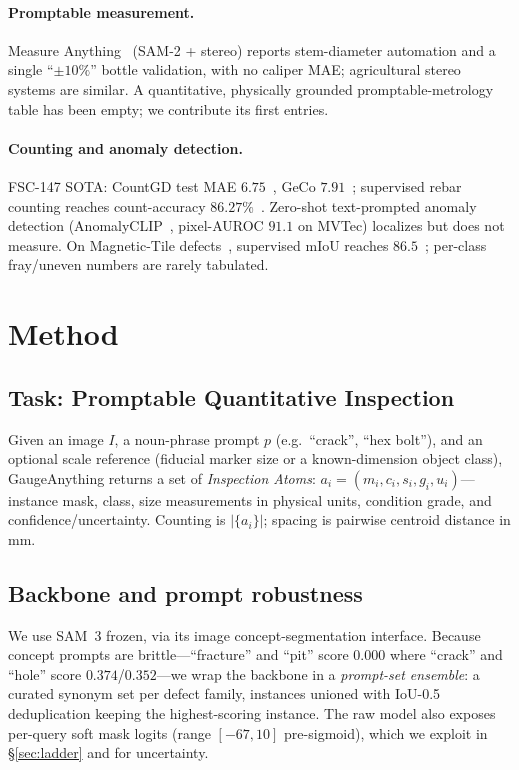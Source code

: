 \documentclass[11pt]{article}
\newcommand{\ours}{GaugeAnything}
\begin{document}
\paragraph{Promptable measurement.} Measure Anything~\citep{measureanything2024} (SAM-2 +
stereo) reports stem-diameter automation and a single ``$\pm10\%$'' bottle validation, with
no caliper MAE; agricultural stereo systems are similar. A quantitative, physically grounded
promptable-metrology table has been empty; we contribute its first entries.

\paragraph{Counting and anomaly detection.} FSC-147 SOTA: CountGD test MAE
$6.75$~\citep{amini2024countgd}, GeCo $7.91$~\citep{pelhan2024geco}; supervised rebar
counting reaches count-accuracy $86.27\%$~\citep{uavrebar2025}. Zero-shot text-prompted
anomaly detection (AnomalyCLIP~\citep{zhou2024anomalyclip}, pixel-AUROC $91.1$ on MVTec)
localizes but does not measure. On Magnetic-Tile defects~\citep{huang2020mt}, supervised
mIoU reaches $86.5$~\citep{liu2023cinformer}; per-class fray/uneven numbers are rarely
tabulated.

\section{Method}\label{sec:method}

\subsection{Task: Promptable Quantitative Inspection}
Given an image $I$, a noun-phrase prompt $p$ (e.g.\ ``crack'', ``hex bolt''), and an optional
scale reference (fiducial marker size or a known-dimension object class), \ours{} returns a
set of \emph{Inspection Atoms}: $a_i = (m_i, c_i, s_i, g_i, u_i)$---instance mask, class,
size measurements in physical units, condition grade, and confidence/uncertainty. Counting
is $|\{a_i\}|$; spacing is pairwise centroid distance in mm.

\subsection{Backbone and prompt robustness}
We use SAM~3 frozen, via its image concept-segmentation interface. Because concept prompts
are brittle---``fracture'' and ``pit'' score $0.000$ where ``crack'' and ``hole'' score
$0.374$/$0.352$---we wrap the backbone in a \emph{prompt-set ensemble}: a curated synonym
set per defect family, instances unioned with IoU-0.5 deduplication keeping the
highest-scoring instance. The raw model also exposes per-query soft mask logits
(range $[-67, 10]$ pre-sigmoid), which we exploit in \S\ref{sec:ladder} and for uncertainty.
\end{document}
